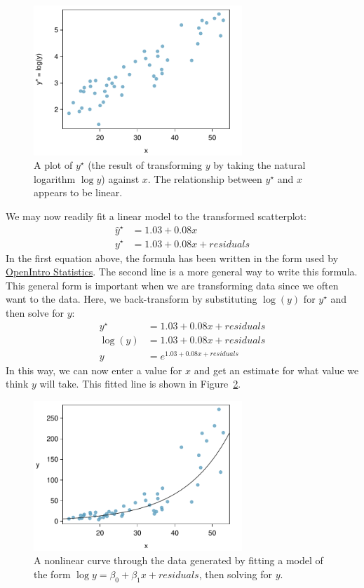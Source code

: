 \begin{figure}
\centering
\includegraphics[width=0.7\textwidth]{RegressionExtras/figures/nonlinear/nonlinear1-3}
\caption{A plot of $y^\star$ (the result of transforming $y$ by taking the natural logarithm $\log y$) against $x$. The relationship between $y^\star$ and $x$ appears to be linear.}
\label{nonlinear1-3}
\end{figure}

We may now readily fit a linear model to the transformed scatterplot:
\begin{align*}
\hat{y}^\star &= 1.03 + 0.08x \\
y^\star &= 1.03 + 0.08x + residuals
\end{align*}
In the first equation above, the formula has been written in the form used by \href{http://www.openintro.org/stat/textbook.php}{OpenIntro Statistics}. The second line is a more general way to write this formula. This general form is important when we are transforming data since we often want to  the data. Here, we back-transform by substituting $\log(y)$ for $y^\star$ and then solve for $y$:
\begin{align*}
y^\star &= 1.03 + 0.08x + residuals \\
\log(y) &= 1.03 + 0.08x + residuals \\
y &= e^{1.03 + 0.08x + residuals}
\end{align*}
In this way, we can now enter a value for $x$ and get an estimate for what value we think $y$ will take. This fitted line is shown in Figure~\ref{nonlinear1-4}.

\begin{figure}
\centering
\includegraphics[width=0.7\textwidth]{RegressionExtras/figures/nonlinear/nonlinear1-4}
\caption{A nonlinear curve through the data generated by fitting a model of the form $\log y = \beta_0 + \beta_1x + residuals$, then solving for $y$.}
\label{nonlinear1-4}
\end{figure}

